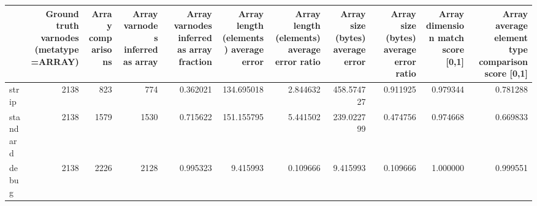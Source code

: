 \begin{tabular}{lrrrrrrrrrr}
\toprule
{} &  Ground truth varnodes (metatype=ARRAY) &  Array comparisons &  Array varnodes inferred as array &  Array varnodes inferred as array fraction &  Array length (elements) average error &  Array length (elements) average error ratio &  Array size (bytes) average error &  Array size (bytes) average error ratio &  Array dimension match score [0,1] &  Array average element type comparison score [0,1] \\
\midrule
strip    &                                    2138 &                823 &                               774 &                                   0.362021 &                             134.695018 &                                     2.844632 &                        458.574727 &                                0.911925 &                           0.979344 &                                           0.781288 \\
standard &                                    2138 &               1579 &                              1530 &                                   0.715622 &                             151.155795 &                                     5.441502 &                        239.022799 &                                0.474756 &                           0.974668 &                                           0.669833 \\
debug    &                                    2138 &               2226 &                              2128 &                                   0.995323 &                               9.415993 &                                     0.109666 &                          9.415993 &                                0.109666 &                           1.000000 &                                           0.999551 \\
\bottomrule
\end{tabular}
